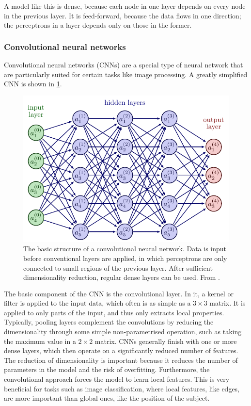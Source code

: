A model like this is dense, because each node in one layer depends on every node in the previous layer.
It is feed-forward, because the data flows in one direction; the perceptrons in a layer depends only on those in the former.



\subsubsection{Convolutional neural networks}
Convolutional neural networks (CNNs) are a special type of neural network that are particularly suited for certain tasks like image processing.
A greatly simplified CNN is shown in \cref{fig:cnn}.

\begin{figure}
    \centering
    \includegraphics[width=0.8\linewidth, page=7]{tex/02_ml/neural_networks.pdf}
    \caption{
        The basic structure of a convolutional neural network.
        Data is input before conventional layers are applied, in which perceptrons are only connected to small regions of the previous layer.
        After sufficient dimensionality reduction, regular dense layers can be used.
        From \cite{nn_figs}.
    }
    \label{fig:cnn}
\end{figure}

The basic component of the CNN is the convolutional layer.
In it, a kernel or filter is applied to the input data, which often is as simple as a $3 \times 3$ matrix.
It is applied to only parts of the input, and thus only extracts local properties.
Typically, pooling layers complement the convolutions by reducing the dimensionality through some simple non-parametrised operation, such as taking the maximum value in a $2 \times 2$ matrix.
CNNs generally finish with one or more dense layers, which then operate on a significantly reduced number of features.
The reduction of dimensionality is important because it reduces the number of parameters in the model and the risk of overfitting.
Furthermore, the convolutional approach forces the model to learn local features.
This is very beneficial for tasks such as image classification, where local features, like edges, are more important than global ones, like the position of the subject.